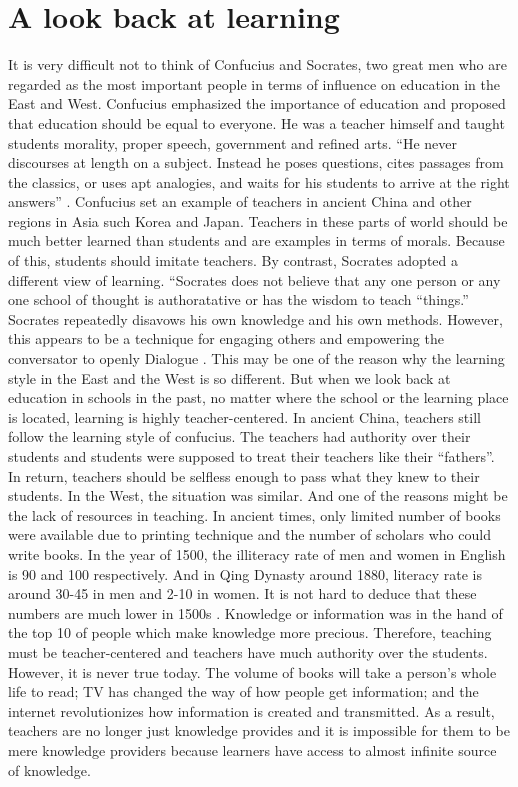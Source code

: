 \documentclass[sigconf]{acmart}
\begin{document}
\section{A look back at learning}
It is very difficult not to think of Confucius and Socrates, two great men who are regarded as the most important people in terms of influence on education in the East and West. Confucius emphasized the importance of education and proposed that education should be equal to everyone. He was a teacher himself and taught students morality, proper speech, government and refined arts. ``He never discourses at length on a subject. Instead he poses questions, cites passages from the classics, or uses apt analogies, and waits for his students to arrive at the right answers'' \cite{Riegel2013}. Confucius set an example of teachers in ancient China and other regions in Asia such Korea and Japan. Teachers in these parts of world should be much better learned than students and are examples in terms of morals. Because of this, students should imitate teachers. By contrast, Socrates adopted a different view of learning. “Socrates does not believe that any one person or any one school of thought is authoratative or has the wisdom to teach  ``things.'' Socrates repeatedly disavows his own knowledge and his own methods. However, this appears to be a technique for engaging others and empowering the conversator to openly Dialogue \cite{Burgess2011}. This may be one of the reason why the learning style in the East and the West is so different. But when we look back at education in schools in the past, no matter where the school or the learning place is located, learning is highly teacher-centered. In ancient China, teachers still follow the learning style of confucius. The teachers had authority over their students and students were supposed to treat their teachers like their “fathers”. In return, teachers should be selfless enough to pass what they knew to their students. In the West, the situation was similar. And one of the reasons might be the lack of resources in teaching. In ancient times, only limited number of books were available due to printing technique and the number of scholars who could write books. In the year of 1500, the illiteracy rate of men and women in English is 90 and 100 respectively. And in Qing Dynasty around 1880, literacy rate is around 30-45 in men and 2-10 in women. It is not hard to deduce that these numbers are much lower in 1500s \cite{RaWski1979}. Knowledge or information was in the hand of the top 10 of people which make knowledge more precious. Therefore, teaching must be teacher-centered and teachers have much authority over the students. However, it is never true today. The volume of books will take a person's whole life to read; TV has changed the way of how people get information; and the internet revolutionizes how information is created and transmitted.  As a result, teachers are no longer just knowledge provides and it is impossible for them to be mere knowledge providers because learners have access to almost infinite source of knowledge.
\end{document}
